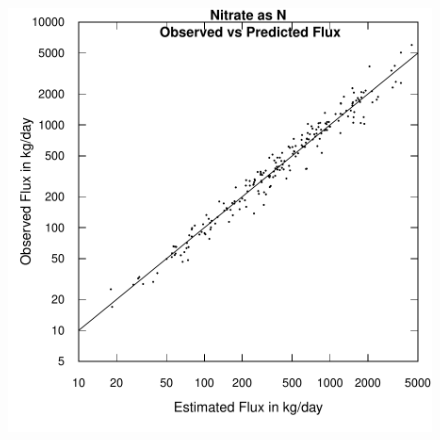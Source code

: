 \documentclass[a4paper,11pt]{article}
\begin{document}
\begin{figure}[htbp]
  \begin{minipage}[h]{0.5\linewidth}
    \begin{center}

\includegraphics{EGRET-figplotLogFluxPred}
    \label{fig:plotLogFluxPred}
    \end{center}
  \end{minipage}
  \hspace{0.5cm}
  \begin{minipage}[h]{0.5\linewidth}
    \begin{center}



\end{center}
\end{minipage}
\end{figure}
\end{document}
